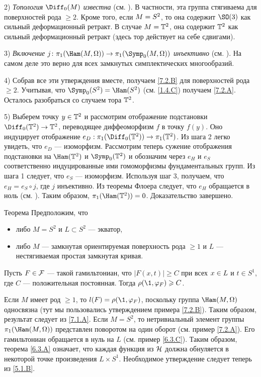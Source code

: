 2) \textit{Топология $\Diff_0 (M)$ известна} (см. \cite{EE}).
В частности, эта группа стягиваема для поверхностей рода $\ge 2$.
Кроме того, если $M \z= S^2$, то она содержит $\SO (3)$ как сильный
деформационный ретракт. 
В случае $M = \mathbb{T}^2$, она содержит $\mathbb{T}^2$ как сильный деформационный
ретракт (здесь тор действует на себе сдвигами). 

3) \textit{Включение $j\: \pi_1 (\Ham (M, \Omega)) \to \pi_1 (\Symp_0 (M,
\Omega))$ инъективно} (см. \cite[10.18 iii]{MS}). 
На самом деле это верно для всех замкнутых симплектических многообразий.

4) Собрав все эти утверждения вместе, получаем \ref{7.2.B} для
поверхностей рода $\ge 2$. 
Учитывая, что $\Symp_0 (S^2) = \Ham (S^2)$ (см. \ref{1.4.C}) получаем
\ref{7.2.A}. 
Осталось разобраться со случаем тора $\mathbb{T}^2$.

5) Выберем точку $y \in \mathbb{T}^2$ и рассмотрим отображение подстановки $\Diff_0 (\TT^2) \to \TT^2$,
переводящее диффеоморфизм $f$ в точку $f(y)$. 
Оно индуцирует отображение $e_D: \pi_1 (\Diff_0 (\TT^2)) \to \pi_1 (\TT^2)$.
Из шага 2 легко увидеть, что $e_D$ — изоморфизм.
Рассмотрим теперь сужение отображения подстановки на $\Ham (\TT^2)$ и
$\Symp_0 (\TT^2)$ и обозначим через $e_H$ и $e_S$ соответственно
индуцированные ими гомоморфизмы фундаментальных групп. 
Из шага 1 следует, что $e_S$ — изоморфизм.
Используя шаг 3, получаем, что $e_H = e_S \circ j$, где $j$ инъективно.
Из теоремы Флоера следует, что $e_H$ обращается в ноль (см. \cite{LMP1}).
Таким образом, $\pi_1 (\Ham (\TT^2)) = 0$. 
Доказательство завершено. 
\qeds

\begin{thm}[(\cite{P5})]{Теорема}\label{7.2.C}
Предположим, что 
\begin{itemize}
\item либо $M = S^2$ и $L \subset S^2$ — экватор, 
\item либо $M$ — замкнутая ориентируемая поверхность рода $\ge 1$ и
  $L$ — нестягиваемая простая замкнутая кривая. 
\end{itemize}
Пусть $F \in \mathcal{F}$ — такой гамильтониан, что $|F(x,t)| \ge C$ при всех $x \z\in L$ и $t \in S^1$, где $C$ — положительная постоянная.
Тогда $\rho (\1, \phi_F) \z\ge C$.
\end{thm}

Если $M$ имеет род $\ge 1$, то $l (F) = \rho (\1, \phi_F)$, поскольку группа $\Ham (M, \Omega)$ односвязна (тут мы пользовались утверждением примера \ref{7.2.B}).
Таким образом, результат следует из \ref{7.1.A}.
Если $M = S^2$, то нетривиальный элемент группы $\pi_1 (\Ham (M, \Omega))$ представлен поворотом на один оборот (см. пример \ref{7.2.A}).
Его гамильтониан обращается в нуль на $L$ (см. пример \ref{6.3.C}).
Таким образом, теорема \ref{6.3.A} означает, что каждая функция из $\mathcal{H}$ должна обнуляется в некоторой точке произведения $L \times S^1$.
Необходимое утверждение следует теперь из \ref{5.1.B}.
\qeds

